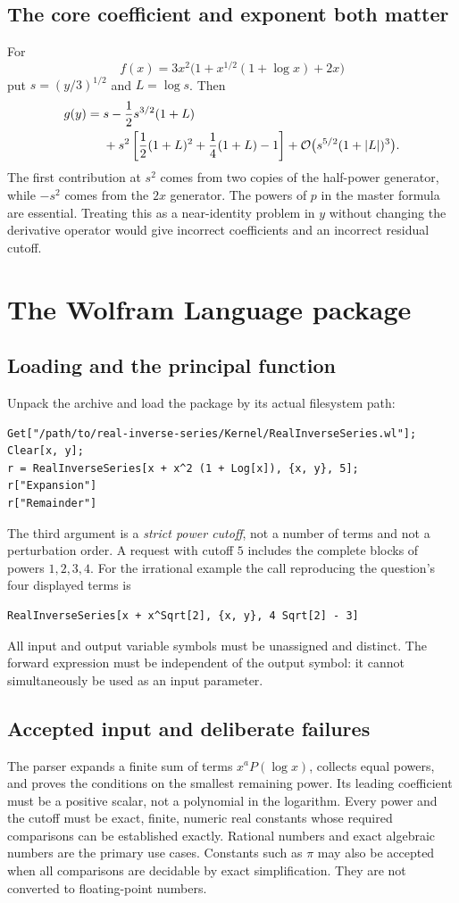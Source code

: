 \documentclass[11pt,a4paper]{article}
\numberwithin{equation}{section}
\theoremstyle{definition}
\newcommand{\OO}{\mathcal O}
\begin{document}
\subsection{The core coefficient and exponent both matter}
For
\[
 f(x)=3x^2\bigl(1+x^{1/2}(1+\log x)+2x\bigr)
\]
put $s=(y/3)^{1/2}$ and $L=\log s$. Then
\begin{align}
 g(y)={}&s-\frac12s^{3/2}(1+L)\notag\\
 &+s^2\left[\frac12(1+L)^2+\frac14(1+L)-1\right]
 +\OO\bigl(s^{5/2}(1+|L|)^3\bigr).
 \label{eq:nonunit-example}
\end{align}
The first contribution at $s^2$ comes from two copies of the half-power
generator, while $-s^2$ comes from the $2x$ generator. The powers of $p$
in the master formula are essential. Treating this as a near-identity
problem in $y$ without changing the derivative operator would give
incorrect coefficients and an incorrect residual cutoff.

\section{The Wolfram Language package}
\label{sec:package}

\subsection{Loading and the principal function}
Unpack the archive and load the package by its actual filesystem path:
\begin{lstlisting}
Get["/path/to/real-inverse-series/Kernel/RealInverseSeries.wl"];
Clear[x, y];
r = RealInverseSeries[x + x^2 (1 + Log[x]), {x, y}, 5];
r["Expansion"]
r["Remainder"]
\end{lstlisting}
The third argument is a \emph{strict power cutoff}, not a number of terms
and not a perturbation order. A request with cutoff $5$ includes the
complete blocks of powers $1,2,3,4$. For the irrational example the call
reproducing the question's four displayed terms is
\begin{lstlisting}
RealInverseSeries[x + x^Sqrt[2], {x, y}, 4 Sqrt[2] - 3]
\end{lstlisting}
All input and output variable symbols must be unassigned and distinct.
The forward expression must be independent of the output symbol: it
cannot simultaneously be used as an input parameter.

\subsection{Accepted input and deliberate failures}
The parser expands a finite sum of terms $x^aP(\log x)$, collects equal
powers, and proves the conditions on the smallest remaining power. Its
leading coefficient must be a positive scalar, not a polynomial in the
logarithm. Every power and the cutoff must be exact, finite, numeric real
constants whose required comparisons can be established exactly. Rational
numbers and exact algebraic numbers are the primary use cases. Constants
such as $\pi$ may also be accepted when all comparisons are decidable by
exact simplification. They are not converted to floating-point numbers.
\end{document}
